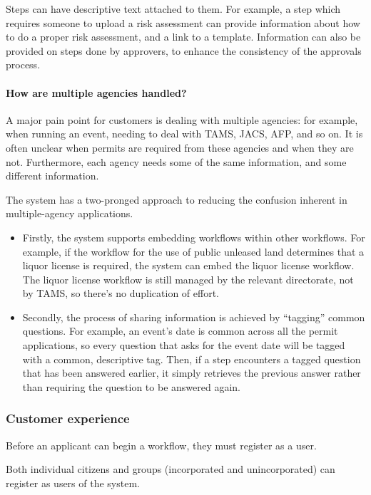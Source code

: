 \documentclass[12pt,a4paper,twosided]{article}
\begin{document}
Steps can have descriptive text attached to them. For example, a step which requires someone to upload a risk assessment can provide information about how to do a proper risk assessment, and a link to a template. Information can also be provided on steps done by approvers, to enhance the consistency of the approvals process.

\paragraph{How are multiple agencies handled?}

A major pain point for customers is dealing with multiple agencies: for example, when running an event, needing to deal with TAMS, JACS, AFP, and so on. It is often unclear when permits are required from these agencies and when they are not. Furthermore, each agency needs some of the same information, and some different information. 

The system has a two-pronged approach to reducing the confusion inherent in multiple-agency applications.
\begin{itemize}
\item Firstly, the system supports embedding workflows within other workflows. For example, if the workflow for the use of public unleased land determines that a liquor license is required, the system can embed the liquor license workflow. The liquor license workflow is still managed by the relevant directorate, not by TAMS, so there's no duplication of effort.

\item Secondly, the process of sharing information is achieved by ``tagging'' common questions. For example, an event's date is common across all the permit applications, so every question that asks for the event date will be tagged with a common, descriptive tag. Then, if a step encounters a tagged question that has been answered earlier, it simply retrieves the previous answer rather than requiring the question to be answered again.
\end{itemize}

\subsubsection{Customer experience}

Before an applicant can begin a workflow, they must register as a user.

Both individual citizens and groups (incorporated and unincorporated)
can register as users of the system.
\end{document}
